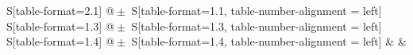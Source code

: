 \begin{table}
    \centering
    \caption{Messdaten der Metallprobe.}
    \label{table:A1}
    \begin{tabular}{
	S[table-format=2.1]
	@{${}\pm{}$}
	S[table-format=1.1, table-number-alignment = left]
	S[table-format=1.3]
	@{${}\pm{}$}
	S[table-format=1.3, table-number-alignment = left]
	S[table-format=1.4]
	@{${}\pm{}$}
	S[table-format=1.4, table-number-alignment = left]
	}
	\toprule
			& 		& 
			\\ 
	\midrule
    
    \bottomrule
    \end{tabular}
    \end{table}
